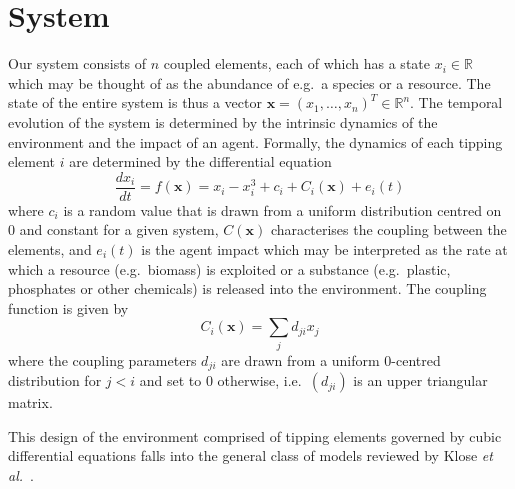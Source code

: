 \documentclass[conference]{IEEEtran}
\newcommand{\vectorsym}[1]{\ensuremath{\mathbf{#1}}}
\newcommand{\agentimpact}{\ensuremath{e}}
\newcommand{\couplingconstant}{\ensuremath{d}}
\newcommand{\couplingfunction}{\ensuremath{C}}
\begin{document}



\section{System}

Our system consists of $n$ coupled elements, each of which has a state
$x_i \in \mathbb{R}$ which may be thought of as the abundance of e.g.\
a species or a resource. The state of the entire system is thus a
vector $\vectorsym{x} = (x_1, \ldots, x_n)^T \in \mathbb{R}^n$. The
temporal evolution of the system is determined by the intrinsic
dynamics of the environment and the impact of an agent. Formally, the
dynamics of each tipping element $i$ are determined by the differential
equation
\begin{equation}
  \label{eq_coupledwithagent}
  \frac{dx_i}{dt} = f(\vectorsym{x}) = x_i - x_i^3 + c_i + \couplingfunction_i(\vectorsym{x}) + \agentimpact_i(t)
\end{equation}
where $c_i$ is a random value that is drawn from a uniform
distribution centred on $0$ and constant for a given system,
$C(\vectorsym{x})$ characterises the coupling  between the elements, and $\agentimpact_i(t)$ is
 the agent impact which may be interpreted as the rate at
which a resource (e.g.\ biomass) is exploited or a substance (e.g.\
plastic, phosphates or other chemicals) is released into the
environment. The coupling function is given by
\begin{equation}
  \label{eq_couplingfunction}
  \couplingfunction_i(\vectorsym{x}) = \sum_j \couplingconstant_{ji} x_j
\end{equation}
where the coupling parameters $\couplingconstant_{ji}$ are drawn from a uniform
$0$-centred distribution for $j < i$ and set to $0$ otherwise, i.e.\
$(\couplingconstant_{ji})$ is an upper triangular matrix.

This design of the environment comprised of tipping elements governed
by cubic differential equations falls into the general class of models
reviewed by Klose \textit{et al.}\
\cite{Klose2019_interactingtippingelements}.
\end{document}
